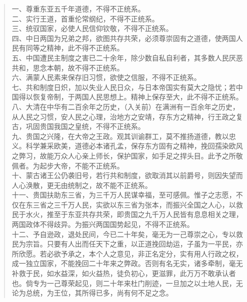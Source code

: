 \begin{quote}
	一、尊重东亚五千年道德，不得不正统系。\\

二、实行王道，首重伦常纲纪，不得不正统系。\\

三、统驭国家，必使人民信仰钦敬，不得不正统系。\\

四、中日两国为兄弟之邦，欲图共存共荣，必须尊崇固有之道德，使两国人民有同等之精神，此不得不正统系。\\

五、中国遭民主制度之害已二十余年，除少数自私自利者，其多数人民厌恶共和，思念本朝，故不得不正统系。\\

六、满蒙人民素来保存旧习惯，欲使之信服，不得不正统系。\\

七、共和制度日炽，加以失业人民日众，与日本帝国实有莫大之隐忧；若中国得以恢复帝制，于两国人民思想上。精神上保存至大，此不得不正统系。\\

八、大清在中华有二百余年之历史，（入关前）在满洲有一百余年之历史，从人民之习惯，安人民之心理，治地方之安靖，存东方之精神，行王政之复古，巩固贵国我国之皇统，不得不正统系。\\

九、贵国之兴隆，在大帝之王政。观其训谕群工，莫不推扬道德，教以忠义。科学兼采欧美，道德必本诸孔孟，保存东方固有之精神，挽回孺染欧风之弊习，故能万众人心亲上师长，保护国家，如手足之捍头目。此予之所敬佩者。为起步大帝，不能不正统系。\\

十、蒙古诸王公仍袭旧号，若行共和制度，欲取消其以前爵号，则因失望而人心涣散，更无由统制之，故不能不正统系。\\

十一、贵国扶助东三省，为三千万人民谋幸福，至可感佩。惟子之志愿，不仅在东三省之三千万人民，实欲以东三省为张本，而振兴全国之人心，以救民于水火，推至于东亚共存共荣，即贵国之九千万人民皆有息息相关之理，两国政体不得歧异。为振兴两国国势起见，不得不正统系。\\

十二、予自逊政，退处民间，今已二十年矣，毫无为一己尊崇之心，专以救民为宗旨。只要有人出而任天下之重，以正道挽回劫运，子虽为一平民，亦所欣愿。若必欲予承之，本个人之意见，非正名定分，实有用人行政之权，成一独立国家，不能挽回二十年来之弊政。否则有名无实，诸多牵制，毫无补救于民，如水益深，如火益热，徒负初心，更滋罪，此万万不敢承认者也。倘专为一己尊荣起见，则二十年来杜门削迹，一旦加之以土地人民，无论为总统，为王位，其所得已多，尚有何不足之念。\\
\end{quote}

